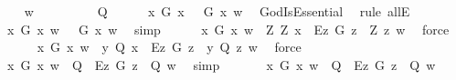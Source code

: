 \begin{isabellebody}
\isanewline
\ \ \isamarkupfalse%
\ w\isanewline
\ \ \ \isacommand{{\isacharbraceleft}}\isamarkupfalse%
\isanewline
\ \ \ \ \isamarkupfalse%
\ Q\isanewline
\ \ \ \ \isamarkupfalse%
\ {\isachardoublequoteopen}{\isacharparenleft}\isactrlbold {\isasymforall}x{\isachardot}\ G\ x\ \isactrlbold {\isasymrightarrow}\ {\isacharparenleft}{\isasymE}\ G\ x{\isacharparenright}{\isacharparenright}\ w{\isachardoublequoteclose}\ \isamarkupfalse%
\ GodIsEssential\ \isamarkupfalse%
\ {\isacharparenleft}rule\ allE{\isacharparenright}\ \isanewline
\ \ \ \ \isamarkupfalse%
\ {\isachardoublequoteopen}{\isasymforall}x{\isachardot}\ G\ x\ w\ {\isasymlongrightarrow}\ {\isasymE}\ G\ x\ w{\isachardoublequoteclose}\ \isamarkupfalse%
\ simp\isanewline
\ \ \ \ \isamarkupfalse%
\ {\isachardoublequoteopen}{\isasymforall}x{\isachardot}\ G\ x\ w\ {\isasymlongrightarrow}\ {\isacharparenleft}\isactrlbold {\isasymforall}Z{\isachardot}\ Z\ x\ \isactrlbold {\isasymrightarrow}\ \isactrlbold {\isasymbox}{\isacharparenleft}\isactrlbold {\isasymforall}\isactrlsup Ez{\isachardot}\ G\ z\ \isactrlbold {\isasymrightarrow}\ Z\ z{\isacharparenright}{\isacharparenright}\ w{\isachardoublequoteclose}\ \isamarkupfalse%
\ force\isanewline
\ \ \ \ \isamarkupfalse%
\ {\isachardoublequoteopen}{\isasymforall}x{\isachardot}\ G\ x\ w\ {\isasymlongrightarrow}\ {\isacharparenleft}{\isacharparenleft}{\isasymlambda}y{\isachardot}\ Q{\isacharparenright}\ x\ \isactrlbold {\isasymrightarrow}\ \isactrlbold {\isasymbox}{\isacharparenleft}\isactrlbold {\isasymforall}\isactrlsup Ez{\isachardot}\ G\ z\ \isactrlbold {\isasymrightarrow}\ {\isacharparenleft}{\isasymlambda}y{\isachardot}\ Q{\isacharparenright}\ z{\isacharparenright}{\isacharparenright}\ w{\isachardoublequoteclose}\ \isamarkupfalse%
\ force\isanewline
\ \ \ \ \isamarkupfalse%
\ {\isachardoublequoteopen}{\isasymforall}x{\isachardot}\ G\ x\ w\ {\isasymlongrightarrow}\ {\isacharparenleft}Q\ \isactrlbold {\isasymrightarrow}\ \isactrlbold {\isasymbox}{\isacharparenleft}\isactrlbold {\isasymforall}\isactrlsup Ez{\isachardot}\ G\ z\ \isactrlbold {\isasymrightarrow}\ Q{\isacharparenright}{\isacharparenright}\ w{\isachardoublequoteclose}\ \isamarkupfalse%
\ simp\isanewline
\ \ \ \ \isamarkupfalse%
\ {}{\isacharcolon}\ {\isachardoublequoteopen}{\isacharparenleft}{\isasymexists}x{\isachardot}\ G\ x\ w{\isacharparenright}\ {\isasymlongrightarrow}\ {\isacharparenleft}{\isacharparenleft}Q\ \isactrlbold {\isasymrightarrow}\ \isactrlbold {\isasymbox}{\isacharparenleft}\isactrlbold {\isasymforall}\isactrlsup Ez{\isachardot}\ G\ z\ \isactrlbold {\isasymrightarrow}\ Q{\isacharparenright}{\isacharparenright}\ w{\isacharparenright}{\isachardoublequoteclose}\ \isamarkupfalse%

\end{isabellebody}
